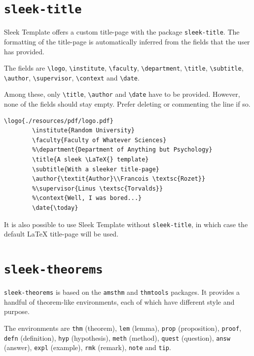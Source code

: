\documentclass[a4paper, 12pt]{report}
\def\tbs{\textbackslash}
\begin{document}
    \newpage

    \section{\texttt{sleek-title}}

    Sleek Template offers a custom title-page with the package \texttt{sleek-title}. The formatting of the title-page is automatically inferred from the fields that the user has provided.

    The fields are \texttt{\tbs{}logo}, \texttt{\tbs{}institute}, \texttt{\tbs{}faculty}, \texttt{\tbs{}department}, \texttt{\tbs{}title}, \texttt{\tbs{}subtitle}, \texttt{\tbs{}author}, \texttt{\tbs{}supervisor}, \texttt{\tbs{}context} and \texttt{\tbs{}date}.

    Among these, only \texttt{\tbs{}title}, \texttt{\tbs{}author} and \texttt{\tbs{}date} have to be provided. However, none of the fields should stay empty. Prefer deleting or commenting the line if so.

    \begin{lstlisting}[style=latexFrameTB, caption={Example of \texttt{sleek-title} title-page definition.}, gobble=8]
        \logo{./resources/pdf/logo.pdf}
        \institute{Random University}
        \faculty{Faculty of Whatever Sciences}
        %\department{Department of Anything but Psychology}
        \title{A sleek \LaTeX{} template}
        \subtitle{With a sleeker title-page}
        \author{\textit{Author}\\Francois \textsc{Rozet}}
        %\supervisor{Linus \textsc{Torvalds}}
        %\context{Well, I was bored...}
        \date{\today}
    \end{lstlisting}

    It is also possible to use Sleek Template without \texttt{sleek-title}, in which case the default \LaTeX{} title-page will be used.

    \newpage

    \section{\texttt{sleek-theorems}}

    \texttt{sleek-theorems} is based on the \texttt{amsthm} and \texttt{thmtools} packages. It provides a handful of theorem-like environments, each of which have different style and purpose.

    The environments are \texttt{thm} (theorem), \texttt{lem} (lemma), \texttt{prop} (proposition), \texttt{proof}, \texttt{defn} (definition), \texttt{hyp} (hypothesis), \texttt{meth} (method), \texttt{quest} (question), \texttt{answ} (answer), \texttt{expl} (example), \texttt{rmk} (remark), \texttt{note} and \texttt{tip}.
\end{document}
